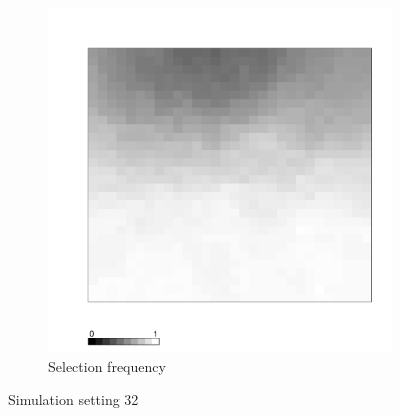 \documentclass[authoryear, review, 11pt]{elsarticle}
\begin{document}
\begin{figure}
	\begin{subfigure}[b]{0.45\textwidth}
	\centering
		\includegraphics[width=\textwidth]{../../figures/simulation/X1.15.32.selection.pdf}
		\caption{Selection frequency}
	\end{subfigure}
	\caption{Simulation setting 32}
\end{figure}
\end{document}
